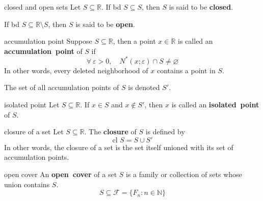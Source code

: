 \documentclass[avery5371,grid]{flashcards}
\newcommand{\N}{\mathbb{N}}
\newcommand{\R}{\mathbb{R}}
\begin{document}
\begin{flashcard}[Definition]{closed and open sets}
Let $S \subseteq \R$.  If bd $S \subseteq S$, then $S$ is said to be
\mbox{\textbf{closed}}.

\bigskip
If bd $S \subseteq \R \setminus S$, then $S$ is said to be
\mbox{\textbf{open}}.
\end{flashcard}

\begin{flashcard}[Definition]{accumulation point}
Suppose $S \subseteq \R$, then a point $x \in \R$ is called an
\mbox{\textbf{accumulation point}} of $S$ if
\begin{equation*}
\forall \ \varepsilon >0, \quad N^{*}(x;\varepsilon) \cap S \neq \varnothing
\end{equation*}
In other words, every deleted neighborhood of $x$ contains a point in $S$.

\medskip
The set of all accumulation points of $S$ is denoted $S'$.
\end{flashcard}

\begin{flashcard}[Definition]{isolated point}
Let $S \subseteq \R$.  If $x \in S$ and $x \not\in S'$,
then $x$ is called an \mbox{\textbf{isolated point}} of $S$.
\end{flashcard}

\begin{flashcard}[Definition]{closure of a set}
Let $S \subseteq \R$.  The \mbox{\textbf{closure}} of $S$ is defined by
\begin{equation*}
\textrm{cl } S = S \cup S'
\end{equation*}
In other words, the closure of a set is the set itself unioned with its
set of accumulation points.
\end{flashcard}


\begin{flashcard}[Definition]{open cover}
An \mbox{\textbf{open cover}} of a set $S$ is a family or collection of sets
whose union contains $S$.
\begin{equation*}
 S \subseteq \mathscr{F} = \{ F_{n} : n \in \N \}
\end{equation*}
\end{flashcard}
\end{document}
